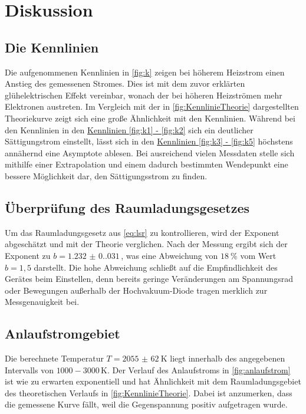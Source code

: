 \section{Diskussion}
\label{sec:Diskussion}

\subsection{Die Kennlinien}
Die aufgenommenen Kennlinien in \autoref{fig:k} zeigen bei höherem Heizstrom einen Anstieg des gemessenen Stromes.
Dies ist mit dem zuvor erklärten glühelektrischen Effekt vereinbar, wonach der bei höheren Heizströmen mehr Elektronen austreten.
Im Vergleich mit der in \autoref{fig:KennlinieTheorie} dargestellten Theoriekurve zeigt sich eine große Ähnlichkeit mit den Kennlinien.
Während bei den Kennlinien in den \hyperref[fig:k]{Kennlinien \ref{fig:k1} - \ref{fig:k2}} sich ein deutlicher Sättigungstrom einstellt,
lässt sich in den \hyperref[fig:k]{Kennlinien \ref{fig:k3} - \ref{fig:k5}} höchstens annähernd eine Asymptote ablesen.
Bei ausreichend vielen Messdaten stelle sich mithilfe einer Extrapolation und einem dadurch bestimmten Wendepunkt eine bessere Möglichkeit dar,
den Sättigungsstrom zu finden.

\subsection{Überprüfung des Raumladungsgesetzes}
Um das Raumladungsgesetz aus \autoref{eq:lsr} zu kontrollieren, wird der Exponent abgeschätzt und mit der Theorie verglichen.
Nach der Messung ergibt sich der Exponent zu $b = \num{1.232(0.031)} \,$, 
was eine Abweichung von $\qty{18}{\percent}$ vom Wert $b = 1,5$ darstellt.
Die hohe Abweichung schließt auf die Empfindlichkeit des Gerätes beim Einstellen, denn bereits
geringe Veränderungen am Spannungsrad oder Bewegungen außerhalb der Hochvakuum-Diode tragen merklich zur Messgenauigkeit bei.

\subsection{Anlaufstromgebiet}
Die berechnete Temperatur $T = \qty{2055(62)}{\kelvin}$ liegt innerhalb des angegebenen Intervalls von $1000 - 3000 \, \mathrm{K}$. 
Der Verlauf des Anlaufstroms in \autoref{fig:anlaufstrom} ist wie zu erwarten exponentiell und
hat Ähnlichkeit mit dem Raumladungsgebiet des theoretischen Verlaufs in \autoref{fig:KennlinieTheorie}.
Dabei ist anzumerken, dass die gemessene Kurve fällt, weil die Gegenspannung positiv aufgetragen wurde.

